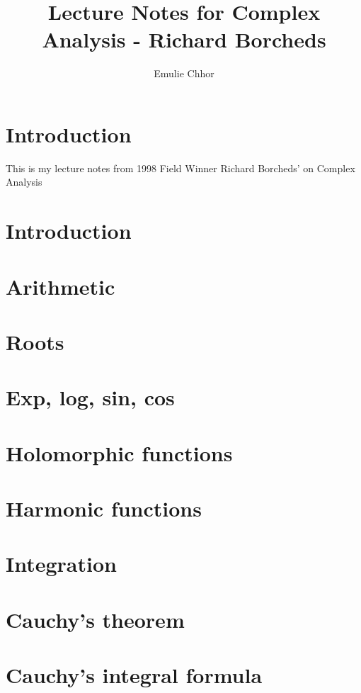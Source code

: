\documentclass{article}
\begin{document}
\title{Lecture Notes for Complex Analysis - Richard Borcheds}
\author{Emulie Chhor}
\maketitle

\section*{Introduction}

This is my lecture notes from 1998 Field Winner Richard Borcheds' on
Complex Analysis

\newtheorem{definition}{Definition}[subsection]
\newtheorem{theorem}{Theorem}[subsection]
\newtheorem{corollary}{Corollary}[subsection]
\newtheorem{lemma}[theorem]{Lemma}
\newtheorem{proposition}{Proposition}[section]
\newtheorem{axiom}{Axiome}
\newtheorem{property}{Propriété}[subsection]
\newtheorem*{remark}{Remarque}
\newtheorem*{problem}{Problème}
\newtheorem*{intuition}{Intuition}

\section{Introduction}
\section{Arithmetic}
\section{Roots}
\section{Exp, log, sin, cos}
\section{Holomorphic functions}
\section{Harmonic functions}
\section{Integration}
\section{Cauchy's theorem}
\section{Cauchy's integral formula}
\end{document}
